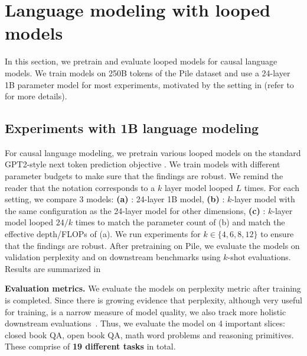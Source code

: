 \section{Language modeling with looped models}
\vspace{-0.01in}
\label{sec:language_modeling}


In this section, we pretrain and evaluate looped models for causal language models.
We train models on 250B tokens of the Pile dataset \citep{gao2020pile} and use a 24-layer 1B parameter model for most experiments, motivated by the setting in \citet{tay2022ul2} (refer to  for more details).
\vspace{-0.1in}

\subsection{Experiments with 1B language modeling}
\label{sec:expt_1B}

For causal language modeling, we pretrain various looped models on the standard GPT2-style next token prediction objective \citep{radford2019language}.
We train models with different parameter budgets to make sure that the findings are robust.
We remind the reader that the notation  corresponds to a $k$ layer model looped $L$ times.
For each setting, we compare 3 models: \textbf{(a)} : 24-layer 1B model, \textbf{(b)} : $k$-layer model with the same configuration as the 24-layer model for other dimensions, \textbf{(c)} : $k$-layer model looped $24/k$ times to match the parameter count of (b) and match the effective depth/FLOPs of (a).
We run experiments for $k\in\{4, 6, 8, 12\}$ to ensure that the findings are robust.
After pretraining on Pile, we evaluate the models on validation perplexity and on downstream benchmarks using  $k$-shot evaluations. Results are summarized in 









\textbf{Evaluation metrics.}
We evaluate the models on perplexity metric after training is completed. Since there is growing evidence that perplexity, although very useful for training, is a narrow measure of model quality, we also track more holistic downstream evaluations~\citep{liang2023holistic}.
Thus, we evaluate the model on 4 important slices: closed book QA, open book QA, math word problems and reasoning primitives. These comprise of {\bf 19 different tasks} in total.

